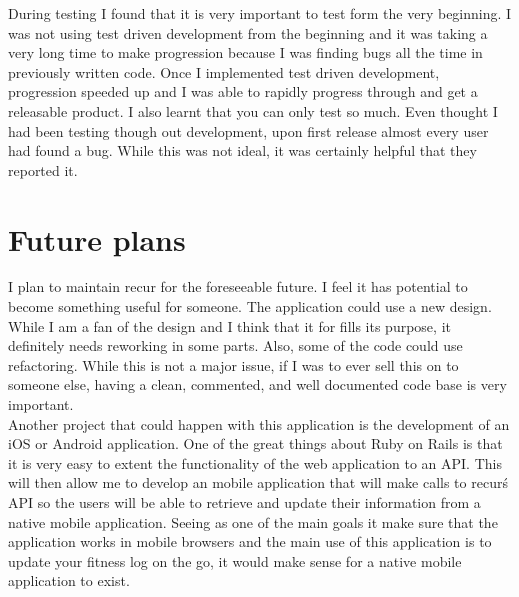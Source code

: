 During testing I found that it is very important to test form the very beginning. I was not using test driven development from the beginning and it was taking a very long time to make progression because I was finding bugs all the time in previously written code. Once I implemented test driven development, progression speeded up and I was able to rapidly progress through and get a releasable product. I also learnt that you can only test so much. Even thought I had been testing though out development, upon first release almost every user had found a bug. While this was not ideal, it was certainly helpful that they reported it.\\

\section{Future plans}
I plan to maintain recur for the foreseeable future. I feel it has potential to become something useful for someone. The application could use a new design. While I am a fan of the design and I think that it for fills its purpose, it definitely needs reworking in some parts. Also, some of the code could use refactoring. While this is not a major issue, if I was to ever sell this on to someone else, having a clean, commented, and well documented code base is very important. \\

Another project that could happen with this application is the development of an iOS or Android application. One of the great things about Ruby on Rails is that it is very easy to extent the functionality of the web application to an API. This will then allow me to develop an mobile application that will make calls to recur\'s API so the users will be able to retrieve and update their information from a native mobile application. Seeing as one of the main goals it make sure that the application works in mobile browsers and the main use of this application is to update your fitness log on the go, it would make sense for a native mobile application to exist. 